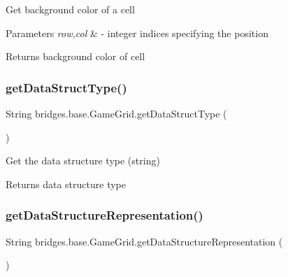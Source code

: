 Get background color of a cell


\begin{DoxyParams}{Parameters}
{\em row,col} & -\/ integer indices specifying the position\\
\hline
\end{DoxyParams}
\begin{DoxyReturn}{Returns}
background color of cell 
\end{DoxyReturn}
\mbox{\label{classbridges_1_1base_1_1_game_grid_a4d88979ac0f74f212392c5efe1400916}} 
\subsubsection{\texorpdfstring{get\+Data\+Struct\+Type()}{getDataStructType()}}
{\footnotesize\ttfamily String bridges.\+base.\+Game\+Grid.\+get\+Data\+Struct\+Type (\begin{DoxyParamCaption}{ }\end{DoxyParamCaption})}



Get the data structure type (string) 

\begin{DoxyReturn}{Returns}
data structure type 
\end{DoxyReturn}
\mbox{\label{classbridges_1_1base_1_1_game_grid_a3c72c7277f9c72ceff82fd063298541e}} 
\subsubsection{\texorpdfstring{get\+Data\+Structure\+Representation()}{getDataStructureRepresentation()}}
{\footnotesize\ttfamily String bridges.\+base.\+Game\+Grid.\+get\+Data\+Structure\+Representation (\begin{DoxyParamCaption}{ }\end{DoxyParamCaption})}

